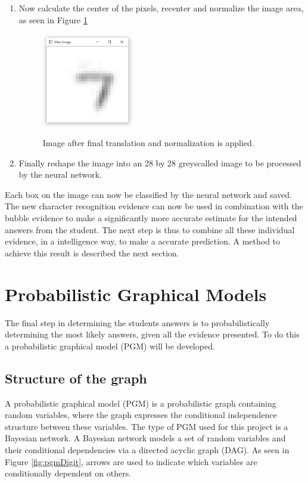 \begin{enumerate}
\item Now calculate the center of the pixels, recenter and normalize the image area, as seen in Figure \ref{fig:final}

\begin{figure}
  \centering
  \includegraphics[width=4cm]{TranslateAndScale}\\
  \caption{Image after final translation and normalization is applied.}
  \label{fig:final}
\end{figure}

\item Finally reshape the image into an 28 by 28 greyscalled image to be processed by the neural network.
\end{enumerate}

Each box on the image can now be classified by the neural network and  saved. The new character recognition evidence can now be used in combination with the bubble evidence to make a significantly more accurate estimate for the intended answers from the student. The next step is thus to combine all these individual evidence, in a intelligence way, to make a accurate prediction. A method to achieve this result is described the next section.

\section{Probabilistic Graphical Models}
\label{sec:PGM}

The final step in determining the students answers is to probabilistically determining the most likely answers, given all the evidence presented. To do this a probabilistic graphical model (PGM) will be developed.

\subsection{Structure of the graph}

A probabilistic graphical model (PGM) is a probabilistic graph containing random variables, where the graph expresses the conditional independence structure between these variables. The type of PGM used for this project is a Bayesian network. A Bayesian network models a set of random variables and their conditional dependencies via a directed acyclic graph (DAG). As seen in Figure \ref{fig:pgmDigit}, arrows are used to indicate which variables are conditionally dependent on others. 

